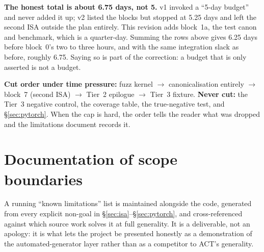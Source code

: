 \documentclass[11pt,a4paper]{article}
\begin{document}
\noindent\textbf{The honest total is about 6.75 days, not 5.} v1 invoked a ``5-day budget'' and never added it
up; v2 listed the blocks but stopped at 5.25 days and left the second ISA outside the plan entirely. This
revision adds block~1a, the test canon and benchmark, which is a quarter-day. Summing the rows above gives
6.25 days before block~0's two to three hours, and with the same integration slack as before, roughly 6.75.
Saying so is part of the correction: a budget that is only asserted is not a budget.

\noindent\textbf{Cut order under time pressure:} fuzz kernel $\rightarrow$ canonicalisation entirely
$\rightarrow$ block~7 (second ISA) $\rightarrow$ Tier~2 epilogue $\rightarrow$ Tier~3 fixture.
\textbf{Never cut:} the Tier~3 negative control, the coverage table, the true-negative test, and
\S\ref{sec:pytorch}. When the cap is hard, the order tells the reader what was dropped and the limitations
document records it.

\section{Documentation of scope boundaries}\label{sec:scope}

A running ``known limitations'' list is maintained alongside the code, generated from every explicit non-goal
in \S\ref{sec:isa}--\S\ref{sec:pytorch}, and cross-referenced against which source work solves it at full
generality. It is a deliverable, not an apology: it is what lets the project be presented honestly as a
demonstration of the automated-generator layer rather than as a competitor to ACT's generality.
\end{document}
